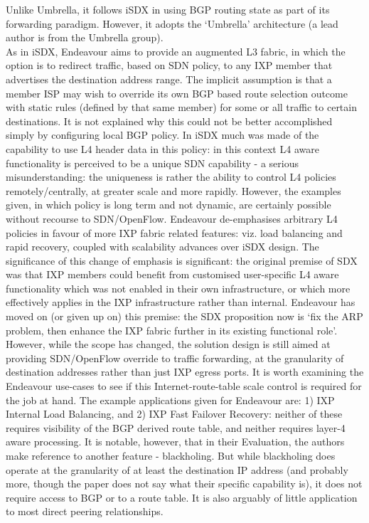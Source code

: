 Unlike Umbrella, it follows iSDX in using BGP routing state as part of its forwarding paradigm.
However, it adopts the `Umbrella' architecture (a lead author is from the Umbrella group).
\\
As in iSDX, Endeavour aims to provide an augmented L3 fabric, in which the option is to redirect traffic, based on SDN policy, to any IXP member that advertises the destination address range.
The implicit assumption is that a member ISP may wish to override its own BGP based route selection outcome with static rules (defined by that same member) for some or all traffic to certain destinations.
It is not explained why this could not be better accomplished simply by configuring local BGP policy.
In iSDX much was made of the capability to use L4 header data in this policy: in this context L4 aware functionality is perceived to be a unique SDN capability - a serious misunderstanding: the uniqueness is rather the ability to control L4 policies remotely/centrally, at greater scale and more rapidly.
However, the examples given, in which policy is long term and not dynamic, are certainly possible without recourse to SDN/OpenFlow.
Endeavour de-emphasises arbitrary L4 policies in favour of more IXP fabric related features: viz. load balancing and rapid recovery, coupled with scalability advances over iSDX design.
The significance of this change of emphasis is significant: the original premise of SDX was that IXP members could benefit from customised user-specific L4 aware functionality which was not enabled in their own infrastructure, or which more effectively applies in the IXP infrastructure rather than internal.
Endeavour has moved on (or given up on) this premise: the SDX proposition now is `fix the ARP problem, then enhance the IXP fabric further in its existing functional role'.
However, while the scope has changed, the solution design is still aimed at providing SDN/OpenFlow override to traffic forwarding, at the granularity of destination addresses rather than just IXP egress ports.
It is worth examining the Endeavour use-cases to see if this Internet-route-table scale control is required for the job at hand.
The example applications given for Endeavour are: 1) IXP Internal Load Balancing, and 2) IXP Fast Failover Recovery: neither of these requires visibility of the BGP derived route table, and neither requires layer-4 aware processing.  It is notable, however, that in their Evaluation, the authors make reference to another feature - blackholing.
But while blackholing does operate at the granularity of at least the destination IP address (and probably more, though the paper does not say what their specific capability is), it does not require access to BGP or to a route table.
It is also arguably of little application to most direct peering relationships.

